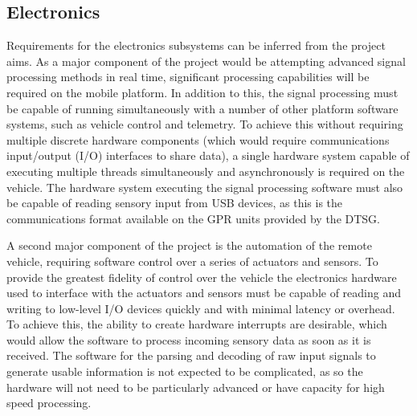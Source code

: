 \documentclass[main.tex]{subfiles}
\begin{document}
\subsection{Electronics}
Requirements for the electronics subsystems can be inferred from the project aims. As a major component of the project would be attempting advanced signal processing methods in real time, significant processing capabilities will be required on the mobile platform. In addition to this, the signal processing must be capable of running simultaneously with a number of other platform software systems, such as vehicle control and telemetry. To achieve this without requiring multiple discrete hardware components (which would require communications input/output (I/O) interfaces to share data), a single hardware system capable of executing multiple threads simultaneously and asynchronously is required on the vehicle. The hardware system executing the signal processing software must also be capable of reading sensory input from USB devices, as this is the communications format available on the GPR units provided by the DTSG. 
% 

A second major component of the project is the automation of the remote vehicle, requiring software control over a series of actuators and sensors. To provide the greatest fidelity of control over the vehicle the electronics hardware used to interface with the actuators and sensors must be capable of reading and writing to low-level I/O devices quickly and with minimal latency or overhead. To achieve this, the ability to create hardware interrupts are desirable, which would allow the software to process incoming sensory data as soon as it is received. The software for the parsing and decoding of raw input signals to generate usable information is not expected to be complicated, as so the hardware will not need to be particularly advanced or have capacity for high speed processing.
\end{document}
